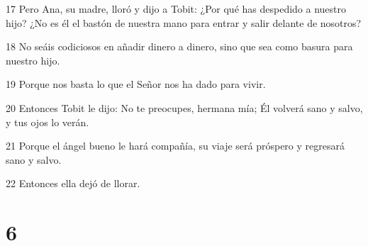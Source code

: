 \par 17 Pero Ana, su madre, lloró y dijo a Tobit: ¿Por qué has despedido a nuestro hijo? ¿No es él el bastón de nuestra mano para entrar y salir delante de nosotros?
\par 18 No seáis codiciosos en añadir dinero a dinero, sino que sea como basura para nuestro hijo.
\par 19 Porque nos basta lo que el Señor nos ha dado para vivir.
\par 20 Entonces Tobit le dijo: No te preocupes, hermana mía; Él volverá sano y salvo, y tus ojos lo verán.
\par 21 Porque el ángel bueno le hará compañía, su viaje será próspero y regresará sano y salvo.
\par 22 Entonces ella dejó de llorar.

\chapter{6}

